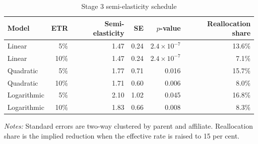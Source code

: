 \begin{table}[H]
\centering
\small
\setlength{\tabcolsep}{4pt}
\caption[Stage 3 semi-elasticity schedule]{Stage 3 semi-elasticity schedule}
\label{tab:stage3_semielasticity}
\begin{tabular}{@{}lrrrrr@{}}
\toprule
Model & ETR & Semi-elasticity & SE & $p$-value & Reallocation share \\
\midrule
Linear &  5\% & 1.47 & 0.24 & $2.4 \times 10^{-7}$ & 13.6\% \\
Linear & 10\% & 1.47 & 0.24 & $2.4 \times 10^{-7}$ &  7.1\% \\
Quadratic &  5\% & 1.77 & 0.71 & 0.016 & 15.7\% \\
Quadratic & 10\% & 1.71 & 0.60 & 0.006 &  8.0\% \\
Logarithmic &  5\% & 2.10 & 1.02 & 0.045 & 16.8\% \\
Logarithmic & 10\% & 1.83 & 0.66 & 0.008 &  8.3\% \\
\bottomrule
\end{tabular}

\vspace{0.35em}
\noindent\begin{minipage}{\textwidth}
\footnotesize\raggedright\textit{Notes:} Standard errors are two-way clustered by parent and affiliate. Reallocation share is the implied reduction when the effective rate is raised to 15 per cent.
\end{minipage}
\end{table}
